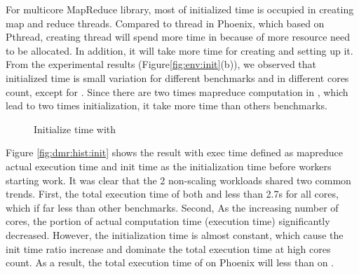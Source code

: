For multicore MapReduce library, most of initialized time is occupied in creating map and reduce threads.
Compared to thread in Phoenix, which based on Pthread, creating thread will spend more time in \myds because of more resource need to be allocated.
In addition, it will take more time for creating  and setting up it.
From the experimental results (Figure\ref{fig:env:init}(b)), we observed that initialized time is small variation for different benchmarks and in different cores count, except for .
Since there are two times mapreduce computation in , which lead to two times initialization, it take more time than others benchmarks.
  

\begin{figure}[htpb]
	\centering
	\caption{Initialize time with \myds}
	\label{fig:init}
\end{figure}




Figure \ref{fig:dmr:hist:init} shows the result with exec time defined as mapreduce actual execution time and init time as the initialization time before workers starting work. 
It was clear that the 2 non-scaling workloads shared two common trends. 
First, the total execution time of both  and  less than 2.7s for all cores, which if far less than other benchmarks. 
Second, As the increasing number of cores, the portion of actual computation time (execution time) significantly decreased.
However, the initialization time is almost constant, which cause the init time ratio increase and dominate the total execution time at high cores count. 
As a result, the total execution time of  on Phoenix will less than on \myds.





